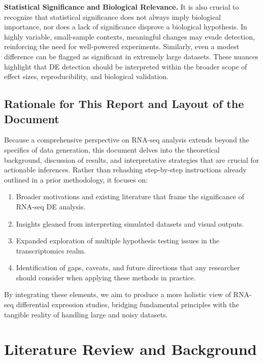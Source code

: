 \documentclass[12pt]{article}
\begin{document}
\textbf{Statistical Significance and Biological Relevance.} It is also crucial to recognize that statistical significance does not always imply biological importance, nor does a lack of significance disprove a biological hypothesis. In highly variable, small-sample contexts, meaningful changes may evade detection, reinforcing the need for well-powered experiments. Similarly, even a modest difference can be flagged as significant in extremely large datasets. These nuances highlight that DE detection should be interpreted within the broader scope of effect sizes, reproducibility, and biological validation.

\subsection{Rationale for This Report and Layout of the Document}
Because a comprehensive perspective on RNA-seq analysis extends beyond the specifics of data generation, this document delves into the theoretical background, discussion of results, and interpretative strategies that are crucial for actionable inferences. Rather than rehashing step-by-step instructions already outlined in a prior methodology, it focuses on:

\begin{enumerate}
    \item Broader motivations and existing literature that frame the significance of RNA-seq DE analysis.
    \item Insights gleaned from interpreting simulated datasets and visual outputs.
    \item Expanded exploration of multiple hypothesis testing issues in the transcriptomics realm.
    \item Identification of gaps, caveats, and future directions that any researcher should consider when applying these methods in practice.
\end{enumerate}

By integrating these elements, we aim to produce a more holistic view of RNA-seq differential expression studies, bridging fundamental principles with the tangible reality of handling large and noisy datasets.

\section{Literature Review and Background}
\label{sec:literature_review}
\end{document}
